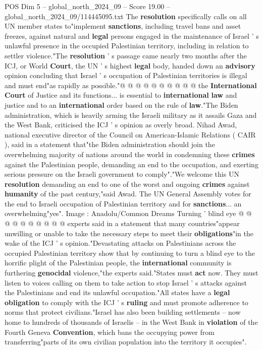 \begin{textsample}{POS Dim 5 – global\_north\_2024\_09 – Score 19.00 – global\_north\_2024\_09/114445095.txt}
The \textbf{resolution} specifically calls on all UN member states to"implement \textbf{sanctions}, including travel bans and asset freezes, against natural and \textbf{legal} persons engaged in the maintenance of Israel ' s unlawful presence in the occupied Palestinian territory, including in relation to settler violence."The \textbf{resolution} ' s passage came nearly two months after the ICJ, or World \textbf{Court}, the UN ' s highest \textbf{legal} body, handed down an \textbf{advisory} opinion concluding that Israel ' s occupation of Palestinian territories is illegal and must end"as rapidly as possible."@ @ @ @ @ @ @ @ @ @ the \textbf{International} \textbf{Court} of Justice and its functions... is essential to \textbf{international} \textbf{law} and justice and to an \textbf{international} order based on the rule of \textbf{law}."The Biden administration, which is heavily arming the Israeli military as it assails Gaza and the West Bank, criticised the ICJ ' s opinion as overly broad.
Nihad Awad, national executive director of the Council on American-Islamic Relations ( CAIR ), said in a statement that"the Biden administration should join the overwhelming majority of nations around the world in condemning these \textbf{crimes} against the Palestinian people, demanding an end to the occupation, and exerting serious pressure on the Israeli government to comply"."We welcome this UN \textbf{resolution} demanding an end to one of the worst and ongoing \textbf{crimes} against \textbf{humanity} of the past century,"said Awad.
The UN General Assembly votes for the end to Israeli occupation of Palestinian territory and for \textbf{sanctions}... an overwhelming"yes".
Image : Anadolu/Common Dreams Turning ' blind eye @ @ @ @ @ @ @ @ @ @ experts said in a statement that many countries"appear unwilling or unable to take the necessary steps to meet their \textbf{obligations}"in the wake of the ICJ ' s opinion."Devastating attacks on Palestinians across the occupied Palestinian territory show that by continuing to turn a blind eye to the horrific plight of the Palestinian people, the \textbf{international} community is furthering \textbf{genocidal} violence,"the experts said."States must \textbf{act} now.
They must listen to voices calling on them to take action to stop Israel ' s attacks against the Palestinians and end its unlawful occupation."All states have a \textbf{legal} \textbf{obligation} to comply with the ICJ ' s \textbf{ruling} and must promote adherence to norms that protect civilians."Israel has also been building settlements -- now home to hundreds of thousands of Israelis -- in the West Bank in \textbf{violation} of the Fourth Geneva \textbf{Convention}, which bans the occupying power from transferring"parts of its own civilian population into the territory it occupies".

\end{textsample}
